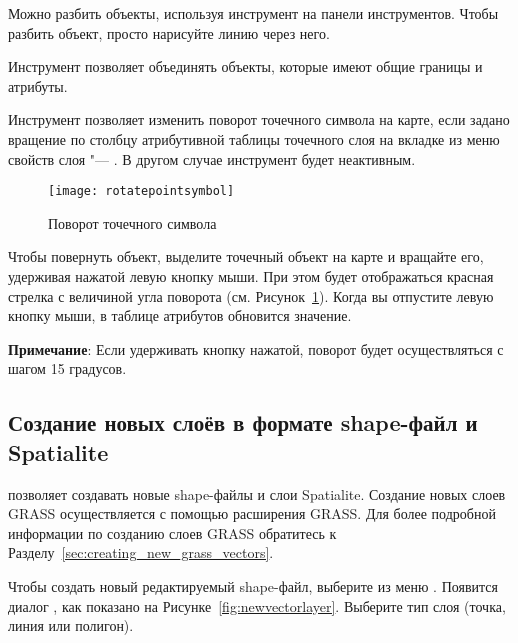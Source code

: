 Можно разбить объекты, используя инструмент
 на панели
инструментов. Чтобы разбить объект, просто нарисуйте линию через него.


Инструмент 
позволяет объединять объекты, которые имеют общие границы и атрибуты.


Инструмент  позволяет
изменить поворот точечного символа на карте, если задано вращение по столбцу
атрибутивной таблицы точечного слоя на вкладке  из меню
свойств слоя "--- . В другом случае инструмент будет
неактивным.

\begin{figure}[ht]
   \centering
   \texttt{[image: rotatepointsymbol]}
   \caption{Поворот точечного символа \wincaption}\label{fig:rotatepoint}
\end{figure}

Чтобы повернуть объект, выделите точечный объект на карте и вращайте его,
удерживая нажатой левую кнопку мыши. При этом будет отображаться красная
стрелка с величиной угла поворота (см. Рисунок~\ref{fig:rotatepoint}).
Когда вы отпустите левую кнопку мыши, в таблице атрибутов обновится значение.

\textbf{Примечание}: Если удерживать кнопку  нажатой, поворот
будет осуществляться с шагом 15 градусов.

\subsection{Создание новых слоёв в формате shape-файл и Spatialite}\label{sec:create shape}

\qg позволяет создавать новые shape-файлы и слои Spatialite. Создание новых
слоев GRASS осуществляется с помощью расширения GRASS. Для более подробной
информации по созданию слоев GRASS обратитесь к Разделу~\ref{sec:creating_new_grass_vectors}.

\label{sec:create shape}

Чтобы создать новый редактируемый shape-файл, выберите  \arrow
{} из меню
. Появится диалог , как показано
на Рисунке~\ref{fig:newvectorlayer}. Выберите тип слоя (точка, линия или полигон).

